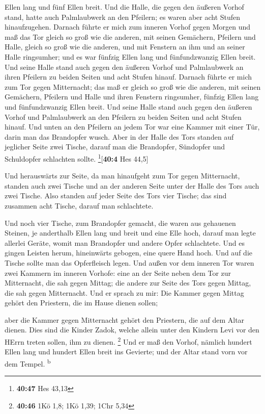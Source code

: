 Ellen lang und fünf Ellen breit.  Und die Halle, die
gegen den äußeren Vorhof stand, hatte auch Palmlaubwerk an den Pfeilern;
es waren aber acht Stufen hinaufzugehen.  Darnach führte
er mich zum inneren Vorhof gegen Morgen und maß das Tor gleich so groß
wie die anderen,  mit seinen Gemächern, Pfeilern und
Halle, gleich so groß wie die anderen, und mit Fenstern an ihm und an
seiner Halle ringsumher; und es war fünfzig Ellen lang und
fünfundzwanzig Ellen breit.  Und seine Halle stand auch
gegen den äußeren Vorhof und Palmlaubwerk an ihren Pfeilern zu beiden
Seiten und acht Stufen hinauf.  Darnach führte er mich
zum Tor gegen Mitternacht; das maß er gleich so groß wie die anderen,
 mit seinen Gemächern, Pfeilern und Halle und ihren
Fenstern ringsumher, fünfzig Ellen lang und fünfundzwanzig Ellen breit.
 Und seine Halle stand auch gegen den äußeren Vorhof und
Palmlaubwerk an den Pfeilern zu beiden Seiten und acht Stufen hinauf.
 Und unten an den Pfeilern an jedem Tor war eine Kammer
mit einer Tür, darin man das Brandopfer wusch.  Aber in
der Halle des Tors standen auf jeglicher Seite zwei Tische, darauf man
die Brandopfer, Sündopfer und Schuldopfer schlachten sollte.
\footnote{\textbf{40:47} Hes 43,13}{[}\textbf{40:4} Hes 44,5{]}

 Und herauswärts zur Seite, da man hinaufgeht zum Tor
gegen Mitternacht, standen auch zwei Tische und an der anderen Seite
unter der Halle des Tors auch zwei Tische.  Also standen
auf jeder Seite des Tors vier Tische; das sind zusammen acht Tische,
darauf man schlachtete.

 Und noch vier Tische, zum Brandopfer gemacht, die waren
aus gehauenen Steinen, je anderthalb Ellen lang und breit und eine Elle
hoch, darauf man legte allerlei Geräte, womit man Brandopfer und andere
Opfer schlachtete.  Und es gingen Leisten herum,
hineinwärts gebogen, eine quere Hand hoch. Und auf die Tische sollte man
das Opferfleisch legen.  Und außen vor dem inneren Tor
waren zwei Kammern im inneren Vorhofe: eine an der Seite neben dem Tor
zur Mitternacht, die sah gegen Mittag; die andere zur Seite des Tors
gegen Mittag, die sah gegen Mitternacht.  Und er sprach
zu mir: Die Kammer gegen Mittag gehört den Priestern, die im Hause
dienen sollen;

 aber die Kammer gegen Mitternacht gehört den Priestern,
die auf dem Altar dienen. Dies sind die Kinder Zadok, welche allein
unter den Kindern Levi vor den HErrn treten sollen, ihm zu dienen.
\footnote{\textbf{40:46} 1Kö 1,8; 1Kö 1,39; 1Chr 5,34} 
Und er maß den Vorhof, nämlich hundert Ellen lang und hundert Ellen
breit ins Gevierte; und der Altar stand vorn vor dem Tempel.
\textsuperscript{b}

